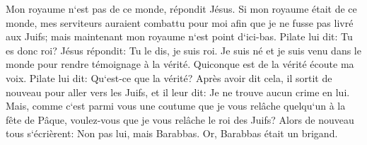 \verse Mon royaume n`est pas de ce monde, répondit Jésus. Si mon royaume était de ce monde, mes serviteurs auraient combattu pour moi afin que je ne fusse pas livré aux Juifs; mais maintenant mon royaume n`est point d`ici-bas. 
\verse Pilate lui dit: Tu es donc roi? Jésus répondit: Tu le dis, je suis roi. Je suis né et je suis venu dans le monde pour rendre témoignage à la vérité. Quiconque est de la vérité écoute ma voix. 
\verse Pilate lui dit: Qu`est-ce que la vérité? Après avoir dit cela, il sortit de nouveau pour aller vers les Juifs, et il leur dit: Je ne trouve aucun crime en lui. 
\verse Mais, comme c`est parmi vous une coutume que je vous relâche quelqu`un à la fête de Pâque, voulez-vous que je vous relâche le roi des Juifs? 
\verse Alors de nouveau tous s`écrièrent: Non pas lui, mais Barabbas. Or, Barabbas était un brigand. 

